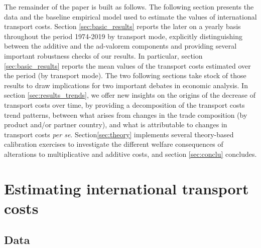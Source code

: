 \documentclass[a4paper,11pt]{article}
\begin{document}
The remainder of the paper is built as follows. The following section presents the data and the baseline empirical model used to estimate the values of international transport costs. Section \ref{sec:basic_results} reports the later on a yearly basis throughout the period 1974-2019 by transport mode, explicitly distinguishing between the additive and the ad-valorem components and providing several important robustness checks of our results. In particular, section \ref{sec:basic_results} reports the mean values of the transport costs estimated over the period (by transport mode). The two following sections take stock of those results to draw implications for two important debates in economic analysis. In section \ref{sec:results_trends}, we offer new insights on the origins of the decrease of transport costs over time, by providing a decomposition of the transport costs trend patterns, between what arises from changes in the trade composition (by product and/or partner country), and what is attributable to changes in transport costs \textit{per se}. Section\ref{sec:theory} implements several theory-based calibration exercises to investigate the different welfare consequences of alterations to multiplicative and additive costs, and section \ref{sec:conclu} concludes.



\section{Estimating international transport costs\label{sec:data_method}}

\subsection{Data}
\end{document}
